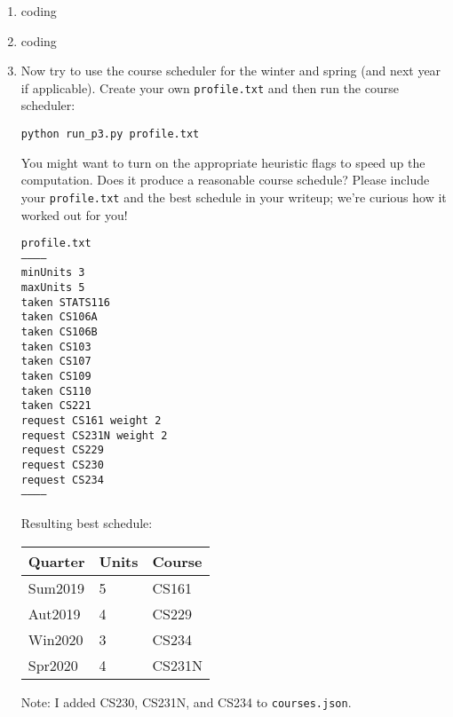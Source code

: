 \documentclass[10pt]{article}
\begin{document}
\begin{enumerate}[label=(\alph*)]

  \item coding
  
  \item coding
  
  \item Now try to use the course scheduler for the winter and spring (and next year if applicable). Create your own \texttt{profile.txt} and then run the course scheduler:

	\texttt{python run\_p3.py profile.txt}

	You might want to turn on the appropriate heuristic flags to speed up the computation. Does it produce a reasonable course schedule? Please include your \texttt{profile.txt} and the best schedule in your writeup; we're curious how it worked out for you!

	\texttt{profile.txt}\\
	\texttt{-----------}\\
	\texttt{minUnits 3}\\
	\texttt{maxUnits 5}\\
	\texttt{taken STATS116}\\
	\texttt{taken CS106A}\\
	\texttt{taken CS106B}\\
	\texttt{taken CS103}\\
	\texttt{taken CS107}\\
	\texttt{taken CS109}\\
	\texttt{taken CS110}\\
	\texttt{taken CS221}\\
	\texttt{request CS161 weight 2}\\
	\texttt{request CS231N weight 2}\\
	\texttt{request CS229}\\
	\texttt{request CS230}\\
	\texttt{request CS234}\\
	\texttt{-----------}

	Resulting best schedule:\\
		\begin{tabular}{l l l}
			Quarter & Units & Course\\
			\hline
	  		Sum2019 & 5 & CS161\\
	  		Aut2019 & 4 & CS229\\
	  		Win2020 & 3 & CS234\\
	  		Spr2020 & 4 & CS231N\\
	  	\end{tabular}
	  	
	  	Note: I added CS230, CS231N, and CS234 to \texttt{courses.json}.

\end{enumerate}
\end{document}
